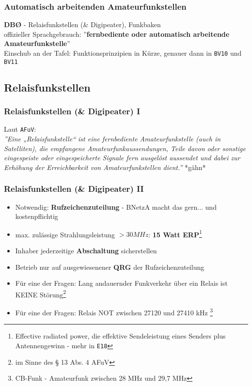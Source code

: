 \begin{frame}
    \frametitle{Automatisch arbeitenden Amateurfunkstellen}

    \textbf{DBØ} - Relaisfunkstellen (\& Digipeater), Funkbaken \\[1em]

    offizieller Sprachgebrauch: ''\textbf{fernbediente oder automatisch arbeitende
    Amateurfunkstelle}'' \\[3em]

    Einschub an der Tafel: Funktionsprinzipien in Kürze, genauer dann in
    \texttt{BV10} und \texttt{BV11}

\end{frame}

\subsection{Relaisfunkstellen}

\begin{frame}
    \frametitle{Relaisfunkstellen (\& Digipeater) I}

    Laut \texttt{AFuV}: \\[1em]
    
    \emph{''Eine „Relaisfunkstelle“ ist eine fernbediente Amateurfunkstelle
    (auch in Satelliten), die empfangene Amateurfunkaussendungen, Teile davon
    oder sonstige eingespeiste oder eingespeicherte Signale fern ausgelöst
    aussendet und dabei zur Erhöhung der Erreichbarkeit von Amateurfunkstellen
    dient.''} *gähn*

\end{frame}

\begin{frame}
    \frametitle{Relaisfunkstellen (\& Digipeater) II}

    \begin{itemize}[<+->]
        \item Notwendig: \textbf{Rufzeichenzuteilung} - BNetzA macht das gern...
              und kostenpflichtig
        \item max. zulässige Strahlungsleistung $>30 MHz$: \textbf{15 Watt
              ERP}\footnote{Effective radiated power, die effektive
              Sendeleistung eines Senders plus Antennengewinn - mehr in
              \texttt{E18}}
        \item Inhaber jederzeitige \textbf{Abschaltung} sicherstellen
        \item Betrieb nur auf ausgewiesenener \textbf{QRG} der Rufzeichenzuteilung
        \item Für eine der Fragen: Lang andauernder Funkverkehr über ein Relais
              ist KEINE Störung\footnote{im Sinne des § 13 Abs. 4 AFuV}
        \item Für eine der Fragen: Relais NOT zwischen 27120 und 27410 kHz
              \footnote{CB-Funk - Amateurfunk zwischen 28 MHz und 29,7 MHz}
    \end{itemize}

\end{frame}

